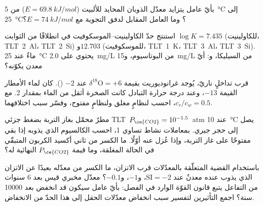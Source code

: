 \begin{exercise}[$\star\star$]\label{exo:b3:water-rock-interaction:8}
بأيّ عامل يتزايد معدّل الذوبان المحايد للألبيت ($E =
\qty{69.8}{kJ/mol}$) من \qty{5}{\celsius} إلى \qty{25}{\celsius}؟ وما
العامل المقابل لدفق التجوية مع $E = \qty{74}{kJ/mol}$؟
\end{exercise}

\begin{exercise}[$\star\star$]\label{exo:b3:water-rock-interaction:9}
استنتج حدّ الكاولينيت--الموسكوفيت في  انطلاقًا من
الثوابت $\log K = 7.435$ (للكاولينيت، \mbox{\textdir TLT 2 Al}، \mbox{\textdir TLT 2 Si}) و$12.703$ (للموسكوفيت، \mbox{\textdir TLT 1 K}،
\mbox{\textdir TLT 3 Al}، \mbox{\textdir TLT 3 Si}). ماءٌ عند \qty{25}{\celsius} يحتوي على \qty{2.0}{mg/L} من
البوتاسيوم، و\qty{15}{mg/L} من السيليكا، و: أيّ معدن يكوّنه؟
\end{exercise}

\begin{exercise}[$\star\star\star$]\label{exo:b3:water-rock-interaction:10}
قرب تداخلٍ ناريّ، يُوجد غرانوديوريت بقيمة $\delta^{18}\mathrm O = +6$
عند $-2$ (\unit{\permil}). كان لماء الأمطار القيمة $-13$، وعند
درجة حرارة التبادل كانت الصخرة أثقل من
الماء بمقدار \qty{2}{\permil}. مع $c_r/c_w = 0.5$، احسب 
لنظامٍ مغلق ولنظامٍ مفتوح، وفسّر سبب اختلافهما.
\end{exercise}

\begin{exercise}[$\star\star\star$]\label{exo:b3:water-rock-interaction:11}
مطرٌ محمّل بغاز التربة بضغط جزئي \mbox{\textdir TLT $P_{\ce{CO2}} = 10^{-1.5}$~atm} عند
\qty{10}{\celsius} يصل إلى حجر جيري. بمعاملات نشاط تساوي 1،
احسب الكالسيوم الذي يذوبه إذا بقي مفتوحًا على غاز التربة، وإذا
عُزل عنه أوّلًا. ما الكسر من ثاني أكسيد الكربون المتبقّي في
الحالة المغلقة، وما قيمة $P_{\ce{CO2}}$ النهائية له؟
\end{exercise}

\begin{exercise}[$\star\star\star$]\label{exo:b3:water-rock-interaction:12}
باستخدام القضية المتعلّقة بالمعدّلات قرب الاتزان، ما الكسر من معدّله
بعيدًا عن الاتزان الذي يذوب عنده معدنٌ عند $\mathrm{SI} =
-2$، و$-1$، و$-0.1$؟ معدّل مخبري قيس بعد \num{6} سنوات من التفاعل
يتبع قانون القوّة الوارد في الفصل: بأيّ عامل سيكون قد انخفض
بعد \num{10000} سنة؟ اجمع التأثيرين لتفسير سبب انخفاض معدّلات الحقل
إلى هذا الحدّ من الانخفاض.
\end{exercise}

